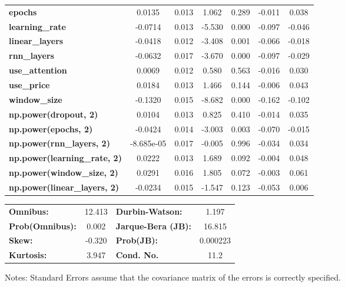 \begin{center}
\begin{tabular}{lcccccc}
\textbf{epochs}                            &       0.0135  &        0.013     &     1.062  &         0.289        &       -0.011    &        0.038     \\
\textbf{learning\_rate}                    &      -0.0714  &        0.013     &    -5.530  &         0.000        &       -0.097    &       -0.046     \\
\textbf{linear\_layers}                    &      -0.0418  &        0.012     &    -3.408  &         0.001        &       -0.066    &       -0.018     \\
\textbf{rnn\_layers}                       &      -0.0632  &        0.017     &    -3.670  &         0.000        &       -0.097    &       -0.029     \\
\textbf{use\_attention}                    &       0.0069  &        0.012     &     0.580  &         0.563        &       -0.016    &        0.030     \\
\textbf{use\_price}                        &       0.0184  &        0.013     &     1.466  &         0.144        &       -0.006    &        0.043     \\
\textbf{window\_size}                      &      -0.1320  &        0.015     &    -8.682  &         0.000        &       -0.162    &       -0.102     \\
\textbf{np.power(dropout, 2)}              &       0.0104  &        0.013     &     0.825  &         0.410        &       -0.014    &        0.035     \\
\textbf{np.power(epochs, 2)}               &      -0.0424  &        0.014     &    -3.003  &         0.003        &       -0.070    &       -0.015     \\
\textbf{np.power(rnn\_layers, 2)}          &   -8.685e-05  &        0.017     &    -0.005  &         0.996        &       -0.034    &        0.034     \\
\textbf{np.power(learning\_rate, 2)}       &       0.0222  &        0.013     &     1.689  &         0.092        &       -0.004    &        0.048     \\
\textbf{np.power(window\_size, 2)}         &       0.0291  &        0.016     &     1.805  &         0.072        &       -0.003    &        0.061     \\
\textbf{np.power(linear\_layers, 2)}       &      -0.0234  &        0.015     &    -1.547  &         0.123        &       -0.053    &        0.006     \\
\bottomrule
\end{tabular}
\begin{tabular}{lclc}
\textbf{Omnibus:}       & 12.413 & \textbf{  Durbin-Watson:     } &    1.197  \\
\textbf{Prob(Omnibus):} &  0.002 & \textbf{  Jarque-Bera (JB):  } &   16.815  \\
\textbf{Skew:}          & -0.320 & \textbf{  Prob(JB):          } & 0.000223  \\
\textbf{Kurtosis:}      &  3.947 & \textbf{  Cond. No.          } &     11.2  \\
\bottomrule
\end{tabular}
\end{center}

Notes: \newline
 [1] Standard Errors assume that the covariance matrix of the errors is correctly specified.